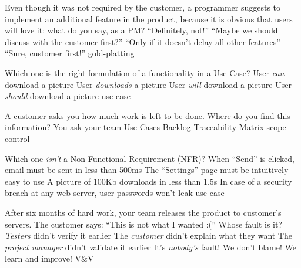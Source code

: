 \documentclass{article}
\begin{document}


\pmbaQuestion
  {Even though it was not required by the customer, a programmer suggests to implement an additional feature in the product, because it is obvious that users will love it; what do you say, as a PM?}
  {``Definitely, not!''}
  {``Maybe we should discuss with the customer first?''}
  {``Only if it doesn't delay all other features''}
  {``Sure, customer first!''}
  {gold-platting}

\pmbaQuestion
  {Which one is the right formulation of a functionality in a Use Case?}
  {User \emph{can} download a picture}
  {User \emph{downloads} a picture}
  {User \emph{will} download a picture}
  {User \emph{should} download a picture}
  {use-case}

\pmbaQuestion
  {A customer asks you how much work is left to be done. Where do you find this information?}
  {You ask your team}
  {Use Cases}
  {Backlog}
  {Traceability Matrix}
  {scope-control}

\pmbaQuestion
  {Which one \emph{isn't} a Non-Functional Requirement (NFR)?}
  {When ``Send'' is clicked, email must be sent in less than 500ms}
  {The ``Settings'' page must be intuitively easy to use}
  {A picture of 100Kb downloads in less than 1.5s}
  {In case of a security breach at any web server, user passwords won't leak}
  {use-case}

\pmbaQuestion
  {After six months of hard work, your team releases the product to customer's servers. The customer says: ``This is not what I wanted :('' Whose fault is it?}
  {\emph{Testers} didn't verify it earlier}
  {The \emph{customer} didn't explain what they want}
  {The \emph{project manager} didn't validate it earlier}
  {It's \emph{nobody's} fault! We don't blame! We learn and improve!}
  {V\&V}
\end{document}
